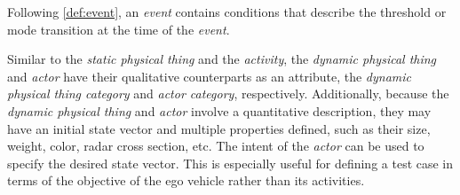 
Following \cref{def:event}, an \textit{event} contains conditions that describe the threshold or mode transition at the time of the \textit{event}.

Similar to the \textit{static physical thing} and the \textit{activity}, the \cstartb\textit{dynamic physical thing} and \textit{actor} have their qualitative counterparts as an attribute, the \textit{dynamic physical thing category} and \textit{actor category}, respectively. Additionally, because the \textit{dynamic physical thing} and \textit{actor} involve a quantitative description, they may have an initial state vector and multiple properties defined, such as their \cendb size, weight, color, radar cross section, etc. \cstartb The intent of the \textit{actor} can be used to specify the desired state vector. \cendb This is especially useful for defining a test case in terms of the objective of the ego vehicle rather than its activities. 



